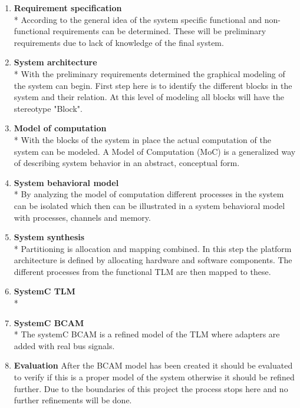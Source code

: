 \begin{enumerate}
		
  \item \textbf{Requirement specification}\\*
  		According to the general idea of the system specific functional and non-functional requirements can be determined. These will be preliminary requirements due to lack of knowledge of the final system. 
  \item \textbf{System architecture}\\*
  		With the preliminary requirements determined the graphical modeling of the system can begin. First step here is to identify the different blocks in the system and their relation. At this level of modeling all blocks will have the stereotype "Block".
  \item \textbf{Model of computation}\\*
  		With the blocks of the system in place the actual computation of the system can be modeled. A Model of Computation (MoC) is a generalized way of describing system behavior in an abstract, conceptual form. 
  \item \textbf{System behavioral model}\\*
  		By analyzing the model of computation different processes in the system can be isolated which then can be illustrated in a system behavioral model with processes, channels and memory.
  \item \textbf{System synthesis}\\*
  		Partitioning is allocation and mapping combined. In this step the platform architecture is defined by allocating hardware and software components. The different processes from the functional TLM are then mapped to these. 
  \item \textbf{SystemC TLM}\\*
  		
  \item \textbf{SystemC BCAM}\\*
  		The systemC BCAM is a refined model of the TLM where adapters are added with real bus signals. 
  \item \textbf{Evaluation}
  		After the BCAM model has been created it should be evaluated to verify if this is a proper model of the system otherwise it should be refined further. Due to the boundaries of this project the process stops here and no further refinements will be done.
\end{enumerate}
